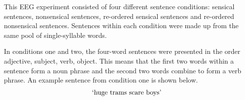 \documentclass[10pt,letterpaper]{article}
\begin{document}
This EEG experiment consisted of four different sentence conditions:
sensical sentences, nonsensical sentences, re-ordered sensical
sentences and re-ordered nonsensical sentences. Sentences within each
condition were made up from the same pool of single-syllable words.

In conditions one and two, the four-word sentences were presented in
the order adjective, subject, verb, object. This means that the first
two words within a sentence form a noun phrase and the second two
words combine to form a verb phrase. An example sentence from
condition one is shown below.
%
%
%
%
\begin{equation}
\label{eq:sensical_sentence}
\text{\lq{}huge trams scare boys\rq{}}
\end{equation}
%
\end{document}
